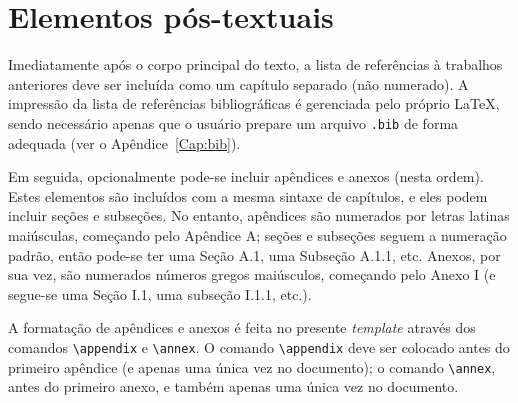 \section{Elementos pós-textuais}
Imediatamente após o corpo principal do texto, a lista de referências à trabalhos anteriores deve ser incluída como um capítulo separado (não numerado). A impressão da lista de referências bibliográficas é gerenciada pelo próprio \LaTeX, sendo necessário apenas que o usuário prepare um arquivo \texttt{.bib} de forma adequada (ver o Apêndice~\ref{Cap:bib}).

Em seguida, opcionalmente pode-se incluir apêndices e anexos (nesta ordem). Estes elementos são incluídos com a mesma sintaxe de capítulos, e eles podem incluir seções e subseções. No entanto, apêndices são numerados por letras latinas maiúsculas, começando pelo Apêndice A; seções e subseções seguem a numeração padrão, então pode-se ter uma Seção A.1, uma Subseção A.1.1, etc. Anexos, por sua vez, são numerados números gregos maiúsculos, começando pelo Anexo I (e segue-se uma Seção I.1, uma subseção I.1.1, etc.).

A formatação de apêndices e anexos é feita no presente \textit{template} através dos comandos \lstinline!\appendix! e \lstinline!\annex!. O comando \lstinline!\appendix! deve ser colocado antes do primeiro apêndice (e apenas uma única vez no documento); o comando \lstinline!\annex!, antes do primeiro anexo, e também apenas uma única vez no documento.
